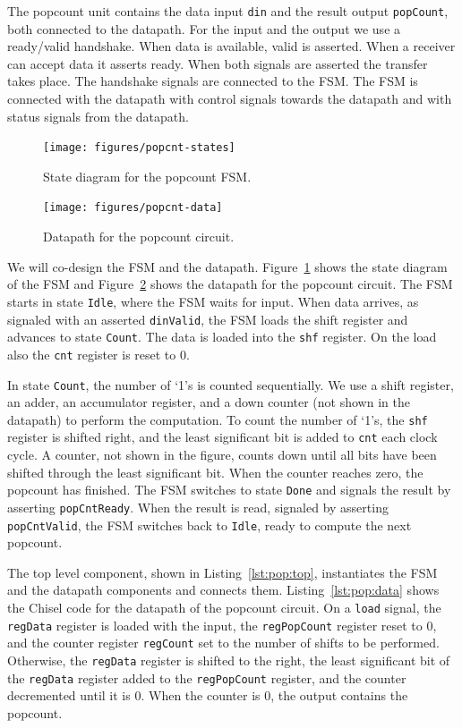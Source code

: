 \documentclass[%
    10pt,
    headinclude, footexclude,
    openright, %
    notitlepage,
    cleardoubleempty,
    headsepline,
    pointlessnumbers,
    bibtotoc, idxtotoc,
    ]{scrbook}
\newcommand{\code}[1]{{\lstinline[basicstyle=\small\ttfamily]{#1}}}
\begin{document}
The popcount unit contains the data input \code{din} and the result output \code{popCount},
both connected to the datapath. For the input and the output we use a ready/valid handshake.
When data is available, valid is asserted. When a receiver can accept data it asserts ready.
When both signals are asserted the transfer takes place. The handshake signals are connected
to the FSM. The FSM is connected with the datapath with control signals towards the datapath
and with status signals from the datapath.

\begin{figure}
  \centering
  \texttt{[image: figures/popcnt-states]}
  \caption{State diagram for the popcount FSM.}
  \label{fig:popcnt-states}
\end{figure}

\begin{figure}
  \centering
  \texttt{[image: figures/popcnt-data]}
  \caption{Datapath for the popcount circuit.}
  \label{fig:popcnt-data}
\end{figure}

We will co-design the FSM and the datapath.
Figure~\ref{fig:popcnt-states} shows the state diagram of the FSM and
Figure~\ref{fig:popcnt-data} shows the datapath for the popcount circuit.
The FSM starts in state \code{Idle}, where the FSM waits for input.
When data arrives, as signaled with an asserted \code{dinValid}, the FSM loads the shift register
and advances to state \code{Count}.
The data is loaded into the \code{shf} register. On the load also the \code{cnt}
register is reset to 0.


In state \code{Count}, the number of `1's is counted sequentially.
We use a shift register, an adder, an accumulator
register, and a down counter (not shown in the datapath) to perform the computation.
To count the number of `1's, the \code{shf} register is shifted
right, and the least significant bit is added to \code{cnt} each clock cycle.
A counter, not shown in the figure, counts down until all bits have been shifted
through the least significant bit.
When the counter reaches zero, the popcount
has finished. The FSM switches to state \code{Done} and signals the result
by asserting \code{popCntReady}. When the result is read, signaled by asserting
\code{popCntValid}, the FSM switches back to \code{Idle},
ready to compute the next popcount.


The top level component, shown in Listing~\ref{lst:pop:top}, instantiates the FSM and the datapath
components and connects them.
Listing~\ref{lst:pop:data} shows the Chisel code for the datapath of the popcount
circuit.
On a \code{load} signal, the \code{regData} register is loaded with the input,
the \code{regPopCount} register reset to 0, and the counter register \code{regCount}
set to the number of shifts to be performed.
Otherwise, the \code{regData} register is shifted to the right, the least significant bit
of the \code{regData} register added to the \code{regPopCount} register, and the counter
decremented until it is 0. When the counter is 0, the output contains the popcount.
\end{document}
